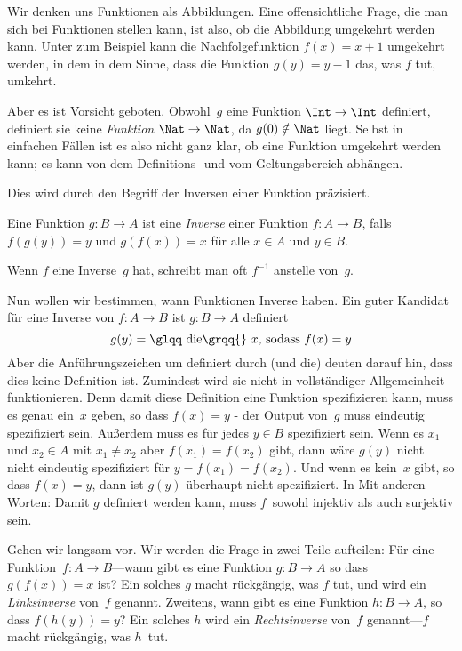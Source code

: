 \documentclass[../../../include/open-logic-section]{subfiles}
\begin{document}

\begin{explain}
Wir denken uns Funktionen als Abbildungen. Eine offensichtliche Frage, die man sich bei
Funktionen stellen kann, ist also, ob die Abbildung \glqq umgekehrt\grqq{} werden kann. Unter
zum Beispiel kann die Nachfolgefunktion $f(x) = x + 1$ umgekehrt werden, in dem
in dem Sinne, dass die Funktion $g(y) = y - 1$ das, was $f$ tut, \glqq umkehrt\grqq{}. 

Aber es ist Vorsicht geboten. Obwohl~$g$ eine
Funktion $\Int \to \Int$ definiert, definiert sie keine \emph{Funktion} $\Nat
\to \Nat$, da $g(0) \notin \Nat$ liegt.  Selbst in einfachen Fällen ist es also
nicht ganz klar, ob eine Funktion umgekehrt werden kann; es kann von dem Definitions-
und vom Geltungsbereich abhängen.

Dies wird durch den Begriff der Inversen einer Funktion präzisiert.
\end{explain}

\begin{defn}
Eine Funktion $g \colon B \to A$ ist eine \emph{Inverse} einer Funktion $f
\colon A \to B$, falls $f(g(y)) = y$ und $g(f(x)) = x$ für alle $x \in A$
und $y \in B$.
\end{defn}

Wenn $f$ eine Inverse~$g$ hat, schreibt man oft $f^{-1}$ anstelle von~$g$.

\begin{explain}
Nun wollen wir bestimmen, wann Funktionen Inverse haben. Ein guter Kandidat
für eine Inverse von $f\colon A \to B$ ist $g\colon B \to A$ \glqq definiert\grqq{}
\[
g(y) = \text{\glqq die\grqq{} $x$, sodass $f(x) = y$}
\]
Aber die Anführungszeichen um \glqq definiert\grqq{} durch (und \glqq die\grqq{}) deuten darauf hin, dass
dies keine Definition ist.  Zumindest wird sie nicht in vollständiger Allgemeinheit funktionieren.
Denn damit diese Definition eine Funktion spezifizieren kann, muss es genau ein~$x$ geben,
so dass $f(x) =
y$ - der Output von~$g$ muss eindeutig spezifiziert sein. Außerdem muss es
für jedes $y \in B$ spezifiziert sein.  Wenn es $x_1$ und $x_2 \in
A$ mit $x_1 \neq x_2$ aber $f(x_1) = f(x_2)$ gibt, dann wäre $g(y)$ nicht
nicht eindeutig spezifiziert für $y = f(x_1) = f(x_2)$. Und wenn es kein~$x$
gibt, so dass $f(x) = y$, dann ist $g(y)$ überhaupt nicht spezifiziert.  In
Mit anderen Worten: Damit $g$ definiert werden kann, muss $f$~sowohl injektiv als auch
surjektiv sein.

Gehen wir langsam vor. Wir werden die Frage in zwei Teile aufteilen: Für eine
Funktion~$f\colon A \to B$---wann gibt es eine Funktion $g\colon B \to A$
so dass $g(f(x)) = x$ ist? Ein solches $g$ \glqq macht rückgängig\grqq{}, was $f$ tut, und wird
ein \emph{Linksinverse} von~$f$ genannt. Zweitens, wann gibt es eine
Funktion $h \colon B \to A$, so dass $f(h(y)) = y$? Ein solches $h$ wird
ein \emph{Rechtsinverse} von~$f$ genannt---$f$ \glqq macht rückgängig\grqq{}, was $h$~tut.
\end{explain}
\end{document}
